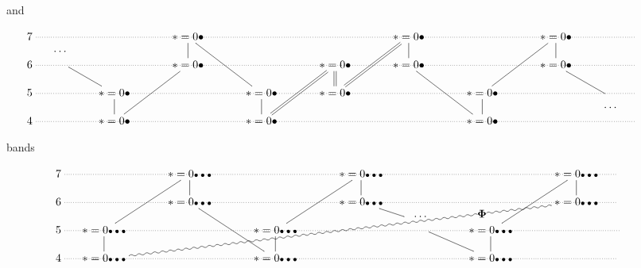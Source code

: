 \documentclass[12pt,a4paper]{amsart}
\theoremstyle{definition}
\theoremstyle{remark}
\numberwithin{equation}{section}
\begin{document}
\begin{table}[htp]
\smallskip
\begin{flushleft}
  and
\end{flushleft}
\smallskip
 \[ \hspace*{-1cm}
      \xymatrix@R=.1ex@C=3ex@!R{
	 {7} \ar@{.} [rrrrrrrrrrrrrrrr] &&&& {*=0{\bullet}} \ar@{-}[dd] \ar@{-}[ddddrr] &&&&&&
  {*=0{\bullet}} \ar@{-}[dd] \ar@{=}[ddddll] &&&& {*=0{\bullet}} \ar@{-}[dd] \ar@{-}[ddddll]  & & {} \\
  &{\cdots\quad} \\
	{6} \ar@{.} [rrrrrrrrrrrrrrrr] &&&& {*=0{\bullet}} \ar@{-}[ddddll] &&&&
 {*=0{\bullet}} \ar@{=}[ddddll] \ar@{=}[dd] &&  {*=0{\bullet}} \ar@{-}[ddddrr]  &&&& {*=0{\bullet}} \ar@{-}[ddr] && {} \\
  {} \\
	{5} \ar@{.} [rrrrrrrrrrrrrrrr] && {*=0{\bullet}} \ar@{-}[uul]
	 \ar@{-}[dd] &&&& {*=0{\bullet}} \ar@{-}[dd]  
 && {*=0{\bullet}}  &&&& {*=0{\bullet}} \ar@{-}[dd] &&& *=0{}& {}  \\
	& &&&&&&&&&&&&&& {\quad \cdots}  \\
	{4}  \ar@{.} [rrrrrrrrrrrrrrrr] && {*=0{\bullet}} &&&& {*=0{\bullet}}  &&&&&& {*=0{\bullet}} &&&& {}
 }   
 \]
 \medskip
 \begin{center}
   \sf bands
 \end{center}
 \medskip
 \[
   
 \xymatrix@R=.1ex@C=3ex@!R{
	 {7} \ar@{.} [rrrrrrrrrrrrrr] &&& {*=0{\mbox{\scriptsize$\bullet\bullet\bullet$}}} \ar@{-}[dd] &&&& {*=0{\mbox{\scriptsize$\bullet\bullet\bullet$}}} \ar@{-}[dd]
 &&&&&& {*=0{\mbox{\scriptsize$\bullet\bullet\bullet$}}} \ar@{-}[dd] && {} \\
  {}\\
	{6} \ar@{.} [rrrrrrrrrrrrrr] &&& {*=0{\mbox{\scriptsize$\bullet\bullet\bullet$}}} \ar@{-}[ddddrr] &&&& {*=0{\mbox{\scriptsize$\bullet\bullet\bullet$}}} \ar@{-}[dr] 
 &&&&&& {*=0{\mbox{\scriptsize$\bullet\bullet\bullet$}}}  && {}  \\
	&&&&&&&& *=0{}& {\hspace*{-1em}\cdots}&&*=0{}  \\
	{5} \ar@{.} [rrrrrrrrrrrrrr] & {*=0{\mbox{\scriptsize$\bullet\bullet\bullet$}}} \ar@{-}[uuuurr] \ar@{-}[dd] &&&&
 {*=0{\mbox{\scriptsize$\bullet\bullet\bullet$}}} \ar@{-}[uuuurr] \ar@{-}[dd] &&&&&&  {*=0{\mbox{\scriptsize$\bullet\bullet\bullet$}}} \ar@{-}[uuuurr]
 \ar@{-}[dd] &&& *=0{} & {} \\ 
	&&&&&&&&&&&&&   \\ 
	{4}  \ar@{.} [rrrrrrrrrrrrrr] &
 {*=0{\mbox{\scriptsize$\bullet\bullet\bullet$}}}\ar@{~}[uuuurrrrrrrrrrrr]|(.8){\mbox{\boldmath$\Phi$}} &&&& {*=0{\mbox{\scriptsize$\bullet\bullet\bullet$}}} &&&&&& {*=0{\mbox{\scriptsize$\bullet\bullet\bullet$}}}
 \ar@{-}[uull] &&&& {} 
 }
 \]
 \end{table}
\end{document}
